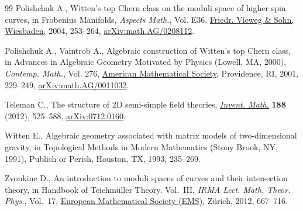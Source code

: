 \documentclass[pdftex]{sigma}
\numberwithin{equation}{section}
\begin{document}
\begin{thebibliography}{99}
Polishchuk A., Witten's top {C}hern class on the moduli space of higher spin
 curves, in Frobenius {M}anifolds, \textit{Aspects Math.}, Vol. E36, \href{https://doi.org/10.1007/978-3-322-80236-1_10}{Friedr.
 Vieweg \& Sohn, Wiesbaden}, 2004, 253--264, \href{https://arxiv.org/abs/math.AG/0208112}{arXiv:math.AG/0208112}.

Polishchuk A., Vaintrob A., Algebraic construction of {W}itten's top {C}hern
 class, in Advances in {A}lgebraic {G}eometry {M}otivated by {P}hysics
 ({L}owell, {MA}, 2000), \textit{Contemp. Math.}, Vol. 276, \href{https://doi.org/10.1090/conm/276/04523}{American
 Mathematical Society}, Providence, RI, 2001, 229--249,
 \href{https://arxiv.org/abs/math.AG/0011032}{arXiv:math.AG/0011032}.

Teleman C., The structure of 2{D} semi-simple field theories, \href{https://doi.org/10.1007/s00222-011-0352-5}{\textit{Invent.
 Math.}} \textbf{188} (2012), 525--588, \href{https://arxiv.org/abs/0712.0160}{arXiv:0712.0160}.

Witten E., Algebraic geometry associated with matrix models of two-dimensional
 gravity, in Topological {M}ethods in {M}odern {M}athematics ({S}tony {B}rook,
 {NY}, 1991), Publish or Perish, Houston, TX, 1993, 235--269.

Zvonkine D., An introduction to moduli spaces of curves and their intersection
 theory, in Handbook of {T}eichm\"uller {T}heory. {V}ol.~{III}, \textit{IRMA
 Lect. Math. Theor. Phys.}, Vol.~17, \href{https://doi.org/10.4171/103-1/12}{European Mathematical Society (EMS)},
 Z\"urich, 2012, 667--716.

\end{thebibliography}\LastPageEnding
\end{document}
